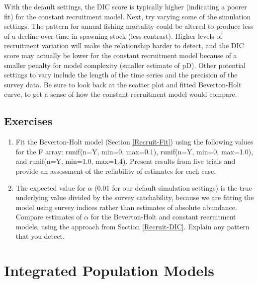 \documentclass[
]{krantz}
\begin{document}
With the default settings, the DIC score is typically higher (indicating a poorer fit) for the constant recruitment model. Next, try varying some of the simulation settings. The pattern for annual fishing mortality could be altered to produce less of a decline over time in spawning stock (less contrast). Higher levels of recruitment variation will make the relationship harder to detect, and the DIC score may actually be lower for the constant recruitment model because of a smaller penalty for model complexity (smaller estimate of pD). Other potential settings to vary include the length of the time series and the precision of the survey data. Be sure to look back at the scatter plot and fitted Beverton-Holt curve, to get a sense of how the constant recruitment model would compare.

\hypertarget{exercises-6}{%
\section{Exercises}\label{exercises-6}}

\begin{enumerate}
\def\labelenumi{\arabic{enumi}.}
\item
  Fit the Beverton-Holt model (Section \ref{Recruit-Fit}) using the following values for the F array: runif(n=Y, min=0, max=0.1), runif(n=Y, min=0, max=1.0), and runif(n=Y, min=1.0, max=1.4). Present results from five trials and provide an assessment of the reliability of estimates for each case.
\item
  The expected value for \(\alpha\) (0.01 for our default simulation settings) is the true underlying value divided by the survey catchability, because we are fitting the model using survey indices rather than estimates of absolute abundance. Compare estimates of \(\alpha\) for the Beverton-Holt and constant recruitment models, using the approach from Section \ref{Recruit-DIC}. Explain any pattern that you detect.
\end{enumerate}

\hypertarget{PopModels}{%
\chapter{Integrated Population Models}\label{PopModels}}
\end{document}
